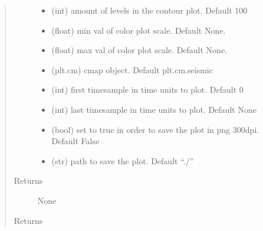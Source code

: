 \documentclass[letterpaper,10pt,english]{sphinxmanual}
\begin{document}
\begin{fulllineitems}
\begin{quote}
\begin{description}
\begin{itemize}
\item {} 
 \textendash{} (int)        amount of levels in the contour plot. Default 100

\item {} 
 \textendash{} (float)      min val of color plot scale. Default None.

\item {} 
 \textendash{} (float)      max val of color plot scale. Default None.

\item {} 
 \textendash{} (plt.cm)     cmap object. Default plt.cm.seismic

\item {} 
 \textendash{} (int)        first timesample in time units to plot. Default 0

\item {} 
 \textendash{} (int)        last timesample in time units to plot. Default None

\item {} 
 \textendash{} (bool)       set to true in order to save the plot in png 300dpi. Default False

\item {} 
 \textendash{} (str)        path to save the plot. Default “./”

\end{itemize}

\item[{Returns}] \leavevmode
None

\item[{Returns}] \leavevmode


\end{description}\end{quote}

\end{fulllineitems}

\end{document}
